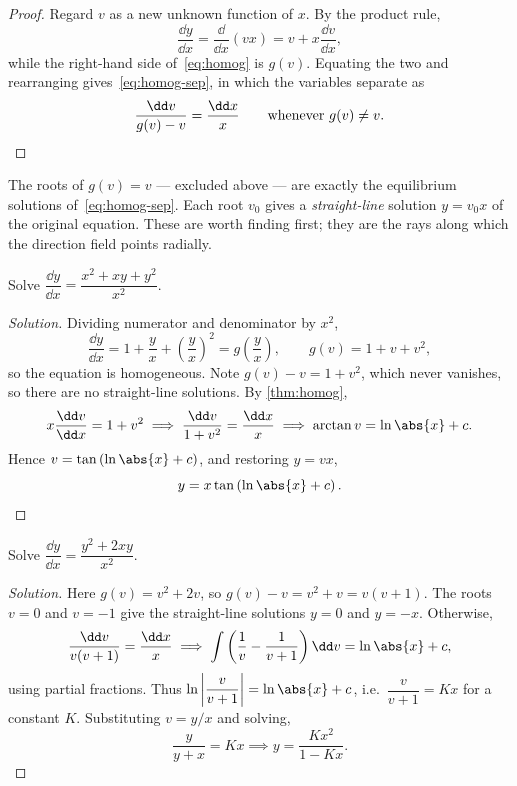 \begin{proof}
	Regard \(v\) as a new unknown function of \(x\). By the product rule,
	\[
		\frac{\dd y}{\dd x} = \frac{\dd}{\dd x}(v x) = v + x \frac{\dd v}{\dd x},
	\]
	while the right-hand side of~\eqref{eq:homog} is \(g(v)\). Equating the two and
	rearranging gives~\eqref{eq:homog-sep}, in which the variables separate as
	\[
		\frac{\dd v}{g(v) - v} = \frac{\dd x}{x}
		\qquad \text{whenever } g(v) \neq v. \qedhere
	\]
\end{proof}

\begin{remark}
	The roots of \(g(v) = v\) --- excluded above --- are exactly the equilibrium solutions
	of~\eqref{eq:homog-sep}. Each root \(v_0\) gives a \emph{straight-line} solution
	\(y = v_0 x\) of the original equation. These are worth finding first; they are
	the rays along which the direction field points radially.
\end{remark}

\begin{eg}
	Solve \(\dfrac{\dd y}{\dd x} = \dfrac{x^2 + xy + y^2}{x^2}\).
\end{eg}

\begin{proof}[Solution]
	Dividing numerator and denominator by \(x^2\),
	\[
		\frac{\dd y}{\dd x} = 1 + \frac{y}{x} + \left( \frac{y}{x} \right)^{2}
		= g\!\left( \frac{y}{x} \right), \qquad g(v) = 1 + v + v^2,
	\]
	so the equation is homogeneous. Note \(g(v) - v = 1 + v^2\), which never vanishes, so
	there are no straight-line solutions. By \autoref{thm:homog},
	\[
		x \frac{\dd v}{\dd x} = 1 + v^{2}
		\implies \frac{\dd v}{1 + v^{2}} = \frac{\dd x}{x}
		\implies \arctan v = \ln\abs{x} + c.
	\]
	Hence \(v = \tan\left( \ln\abs{x} + c \right)\), and restoring \(y = vx\),
	\[
		y = x \tan\left( \ln\abs{x} + c \right).
	\]
\end{proof}

\begin{eg}
	Solve \(\dfrac{\dd y}{\dd x} = \dfrac{y^2 + 2xy}{x^2}\).
\end{eg}

\begin{proof}[Solution]
	Here \(g(v) = v^2 + 2v\), so \(g(v) - v = v^2 + v = v(v+1)\). The roots \(v = 0\) and
	\(v = -1\) give the straight-line solutions \(y = 0\) and \(y = -x\). Otherwise,
	\[
		\frac{\dd v}{v(v+1)} = \frac{\dd x}{x}
		\implies \int \left( \frac{1}{v} - \frac{1}{v+1} \right) \dd v = \ln\abs{x} + c,
	\]
	using partial fractions. Thus \(\ln\left| \dfrac{v}{v+1} \right| = \ln\abs{x} + c\),
	i.e.\ \(\dfrac{v}{v+1} = Kx\) for a constant \(K\). Substituting \(v = y/x\) and
	solving,
	\[
		\frac{y}{y + x} = Kx
		\implies y = \frac{K x^{2}}{1 - Kx}.
	\]
\end{proof}

